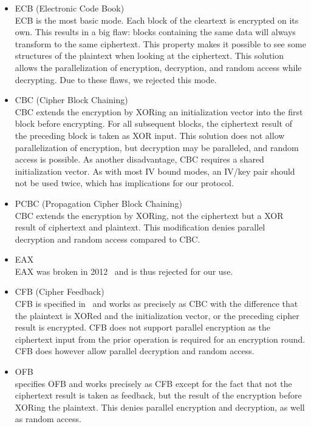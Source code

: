 \begin{itemize}
	\item ECB (Electronic Code Book)\\
	ECB is the most basic mode. Each block of the cleartext is encrypted on its own. This results in a big flaw: blocks containing the same data will always transform to the same ciphertext. This property makes it possible to see some structures of the plaintext when looking at the ciphertext. This solution allows the parallelization of encryption, decryption, and random access while decrypting. Due to these flaws, we rejected this mode.
	\item CBC (Cipher Block Chaining)\\  
	CBC extends the encryption by XORing an initialization vector into the first block before encrypting. For all subsequent blocks, the ciphertext result of the preceding block is taken as XOR input. This solution does not allow parallelization of encryption, but decryption may be paralleled, and random access is possible. As another disadvantage, CBC requires a shared initialization vector. As with most IV bound modes, an IV/key pair should not be used twice, which has implications for our protocol.
	\item PCBC (Propagation Cipher Block Chaining)\\
	CBC extends the encryption by XORing, not the ciphertext but a XOR result of ciphertext and plaintext. This modification denies parallel decryption and random access compared to CBC.
	\item EAX\\      
	EAX was broken in 2012~\cite{minematsu2013attacks} and is thus rejected for our use.
	\item CFB (Cipher Feedback)\\
	CFB is specified in~\cite{dworkin2001recommendation} and works as precisely as CBC with the difference that the plaintext is XORed and the initialization vector, or the preceding cipher result is encrypted. CFB does not support parallel encryption as the ciphertext input from the prior operation is required for an encryption round. CFB does however allow parallel decryption and random access.
	\item OFB\\
	\cite{dworkin2001recommendation} specifies OFB and works precisely as CFB except for the fact that not the ciphertext result is taken as feedback, but the result of the encryption before XORing the plaintext. This denies parallel encryption and decryption, as well as random access.

\end{itemize}
